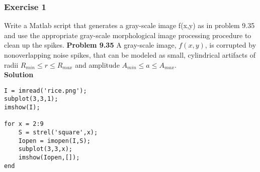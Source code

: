 \subsubsection{Exercise 1}
Write a Matlab script that generates a gray-scale image f(x,y) as in problem 9.35 and use the appropriate gray-scale morphological image processing procedure to clean up the spikes.
\textbf{Problem 9.35}
A gray-scale image, $f(x,y)$, is corrupted by nonoverlapping noise spikes, that can be modeled as small, cylindrical artifacts of radii $R_{min}\leq r\leq R_{max}$ and amplitude $A_{min}\leq a \leq A_{max}$.\\
\textbf{Solution}
\begin{lstlisting}
I = imread('rice.png');
subplot(3,3,1);
imshow(I);

for x = 2:9
    S = strel('square',x);
    Iopen = imopen(I,S);
    subplot(3,3,x);
    imshow(Iopen,[]);
end
\end{lstlisting}